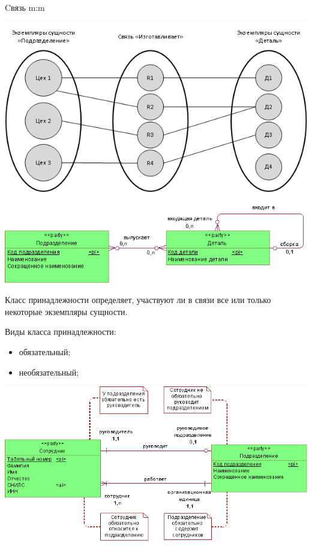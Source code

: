 \documentclass{beamer}
\begin{document}
\begin{frame}
\begin{block}{Cвязь m:m}
\begin{center}
\includegraphics[scale=0.5]{images/many-many.png}
\end{center}
\begin{center}
\includegraphics[scale=0.5]{images/many-many-er.png}
\end{center}
\end{block}
\end{frame}

\begin{frame}
\begin{block}{Класс принадлежности}
определяет, участвуют ли в связи все или только некоторые экземпляры сущности.
\end{block}
Виды класса принадлежности:
\begin{itemize}
\item обязательный;
\item необязательный;
\end{itemize}
\begin{center}
\includegraphics[scale=0.5]{images/requery.png}
\end{center}
\end{frame}
\end{document}
